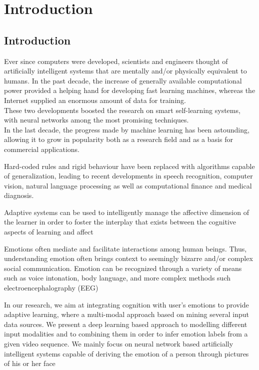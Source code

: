 \chapter{Introduction}
\section{Introduction}
Ever since computers were developed, scientists and engineers thought of artificially intelligent systems that are mentally and/or physically equivalent to humans. In the past decade, the increase of generally available computational power provided a helping hand for developing fast learning machines, whereas the Internet supplied an enormous amount of data for training.\\ 
These two developments boosted the research on smart self-learning systems, with neural networks among the most promising techniques.\\
In the last decade, the progress made by machine learning has been astounding, allowing it to grow in popularity both as a research field and as a basis for commercial applications.

Hard-coded rules and rigid behaviour have been replaced with algorithms capable of generalization, leading to recent developments in speech recognition, computer vision, natural language processing as well as computational finance and medical diagnosis.

Adaptive systems can be used to intelligently manage the affective dimension of the learner in order to foster the interplay that exists between the cognitive aspects of learning and affect

Emotions often mediate and facilitate interactions among human beings. Thus, understanding emotion often brings context to seemingly bizarre and/or complex social communication. Emotion can be recognized through a variety of means such as voice intonation, body language, and more complex methods such electroencephalography (EEG)

In our research,  we aim at integrating cognition with user’s emotions to provide adaptive learning, where a multi-modal approach based on mining several input data sources. We present a deep learning based approach to modelling different input modalities and to combining them in order to infer emotion labels from a given video sequence. We mainly focus on neural network based artificially intelligent systems capable of deriving the emotion of a person through pictures of his or her face

